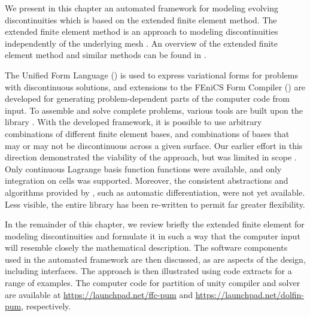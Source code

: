 We present in this chapter an automated framework for modeling
evolving discontinuities which is based on the extended finite
element method. The extended finite element method is an
approach to modeling discontinuities independently of the underlying mesh
\citep{BelytschkoBlack1999,MoesDolbowBelytschko1999,WellsSluys2001}.
An overview of the extended finite element method and similar methods
can be found in \citet{BabuskaBanerjeeOsborn2003}.

The Unified Form
Language (\ufl) is used to express variational forms for problems with
discontinuous solutions, and extensions to the FEniCS Form Compiler
(\ffc) are developed for generating problem-dependent parts of the
computer code from \ufl{} input. To assemble and solve complete problems,
various tools are built upon the library \dolfin.  With the developed
framework, it is possible to use arbitrary combinations of different
finite element bases, and combinations of bases that may or may not
be discontinuous across a given surface. Our earlier effort in this
direction demonstrated the viability of the approach, but was limited in
scope \citep{NikbakhtWells2009}. Only continuous Lagrange basis function
functions were available, and only integration on cells was supported.
Moreover, the consistent abstractions and algorithms provided by {\ufl},
such as automatic differentiation, were not yet available. Less visible,
the entire library has been re-written to permit far greater flexibility.

In the remainder of this chapter, we review briefly the extended
finite element for modeling \hbox{discontinuities} and formulate
it in such a way that the computer input will resemble closely the
mathematical description. The software components used in the automated
framework are then discussed, as are aspects of the design, including
interfaces. The approach is then illustrated using code extracts for a
range of examples.  The computer code for partition of unity
compiler and solver are available at \url{https://launchpad.net/ffc-pum}
and \url{https://launchpad.net/dolfin-pum}, respectively.
